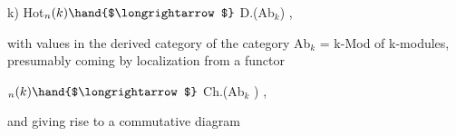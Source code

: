 \hand{(}k) \qquad Hot$_n(k) \hand{$\longrightarrow$}$ D.(Ab$_k$) \quad ,

with values in the derived category of the category Ab$_k$ = k-Mod of
k-modules, presumably coming by localization from a functor

 \qquad {}$_n(k) \hand{$\longrightarrow$}$ Ch.(Ab$_k$ ) \quad ,

and giving rise to a commutative diagram 

